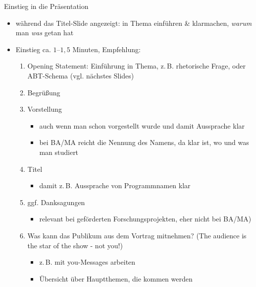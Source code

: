 \begin{frame}{Einstieg in die Präsentation}
    \begin{itemize}
        \item während das Titel-Slide angezeigt: in Thema einführen \& klarmachen, \emph{warum} man \emph{was} getan hat
        \item Einstieg ca. $1$–$1,5$ Minuten, Empfehlung:
        \begin{enumerate}
            \item Opening Statement: Einführung in Thema, z.\,B. rhetorische Frage, oder ABT-Schema (vgl. nächstes Slides)
            \item Begrüßung
            \item Vorstellung
            \begin{itemize}
                \item auch wenn man schon vorgestellt wurde und damit Aussprache klar
                \item bei BA/MA reicht die Nennung des Namens, da klar ist, wo und was man studiert
            \end{itemize}
            \item Titel
            \begin{itemize}
                \item damit z.\,B. Aussprache von Programmnamen klar
            \end{itemize}
            \item ggf. Danksagungen
            \begin{itemize}
                \item relevant bei geförderten Forschungsprojekten, eher nicht bei BA/MA)
            \end{itemize}
            \item Was kann das Publikum aus dem Vortrag mitnehmen? (The audience is the star of the show - not you!)
            \begin{itemize}
                \item z.\,B. mit you-Messages arbeiten
                \item Übersicht über Hauptthemen, die kommen werden
            \end{itemize}
        \end{enumerate}
    \end{itemize}
\end{frame}

